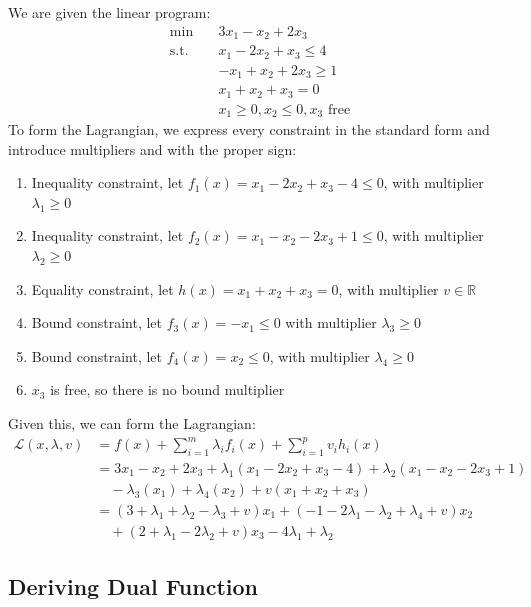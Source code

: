 \documentclass[12pt]{article}
\begin{document}
We are given the linear program: \begin{align}
    \min \quad & 3 x_{1} - x_{2} + 2 x_{3} \nonumber \\
    \text{s.t. } \; & x_{1} - 2 x_{2}+ x_{3} \leq 4 \tag{1}\\ 
    & - x_{1} + x_{2} + 2 x_{3} \geq 1 \tag{2}\\ 
    & x_{1} + x_{2} + x_{3} = 0 \tag{3}\\ 
    & x_{1} \geq 0, x_{2} \leq 0, x_{3} \text{ free} \tag{4}
\end{align} To form the Lagrangian, we express every constraint in the standard form and introduce multipliers and with the proper sign: \begin{enumerate}
    \item Inequality constraint, let $f_{1}(x) = x_{1} - 2 x_{2} + x_{3} - 4 \leq 0$, with multiplier $\lambda_1 \geq 0$
    \item Inequality constraint, let $f_{2}(x) = x_{1} - x_{2} - 2 x_{3} + 1 \leq 0$, with multiplier $\lambda_2 \geq 0$
    \item Equality constraint, let $h(x) = x_{1} + x_{2} + x_{3} = 0$, with multiplier $v \in \mathbb{R}$ 
    \item Bound constraint, let $f_{3}(x) = -x_{1} \leq 0$ with multiplier $\lambda_3 \geq 0$
    \item Bound constraint, let $f_{4}(x) = x_{2} \leq 0$, with multiplier $\lambda_4 \geq 0$
    \item $x_{3}$ is free, so there is no bound multiplier
\end{enumerate} Given this, we can form the Lagrangian: \begin{align*}
    \mathcal{L}(x, \lambda, v) &= f(x) + \sum_{i=1}^{m} \lambda_i f_i(x) + \sum_{i=1}^{p} v_i h_i(x) \\ 
    &= 3 x_{1} - x_{2} + 2 x_{3} + \lambda_1 (x_{1} - 2 x_{2} + x_{3} - 4) + \lambda_2 (x_{1} - x_{2} - 2 x_{3} + 1) \\ 
    & \quad - \lambda_3 (x_{1}) + \lambda_4 (x_{2}) + v(x_{1} + x_{2} + x_{3}) \\ 
    &= (3 + \lambda_1 + \lambda_2 - \lambda_3 + v)x_{1} + (-1 -2 \lambda_1 - \lambda_2 + \lambda_4 + v)x_{2} \\ 
    & \quad + (2 + \lambda_1 -2 \lambda_2 + v)x_{3} - 4\lambda_1 + \lambda_2
\end{align*} 

\subsection*{Deriving Dual Function}
\end{document}
